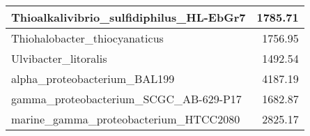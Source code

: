\documentclass[12pt,a4paper]{article}
\begin{document}
\begin{table}[ht]
\begin{center}
\begin{tabular}{|l*{1}{|r}|}
Thioalkalivibrio\_sulfidiphilus\_HL-EbGr7 & 1785.71 \\ \hline
Thiohalobacter\_thiocyanaticus & 1756.95 \\ \hline
Ulvibacter\_litoralis & 1492.54 \\ \hline
alpha\_proteobacterium\_BAL199 & 4187.19 \\ \hline
gamma\_proteobacterium\_SCGC\_AB-629-P17 & 1682.87 \\ \hline
marine\_gamma\_proteobacterium\_HTCC2080 & 2825.17 \\ \hline
\end{tabular}
\end{center}
\end{table}
\end{document}

